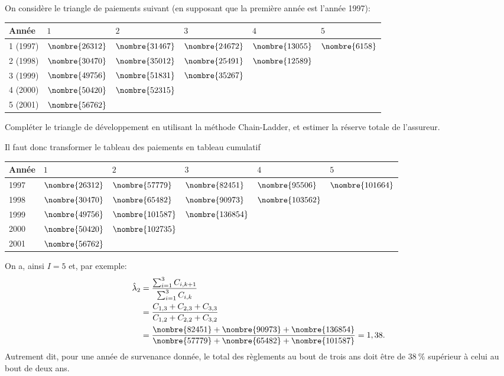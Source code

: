 \begin{exemple}
  On considère le triangle de paiements suivant (en supposant que la
  première année est l'année 1997):
  \begin{center}
    \begin{tabular}{|l|l l l l l|}\hline
      Année & $1$ & $2$ & $3$ & $4$ & $5$  \\ \hline
      1 (1997)& $\nombre{26312}$ & $\nombre{31467}$ & $\nombre{24672}$ & $\nombre{13055}$ & $\nombre{6158}$ \\
      2 (1998)& $\nombre{30470}$ & $\nombre{35012}$ & $\nombre{25491}$ & $\nombre{12589}$ &  \\
      3 (1999)& $\nombre{49756}$ & $\nombre{51831}$ & $\nombre{35267}$ &&\\
      4 (2000)& $\nombre{50420}$ & $\nombre{52315}$ & &&\\
      5 (2001)& $\nombre{56762}$ &  &&&\\ \hline
    \end{tabular}
  \end{center}
  Compléter le triangle de développement en utilisant la méthode
  Chain-Ladder, et estimer la réserve totale de l'assureur.

  Il faut donc transformer le tableau des paiements en tableau
  cumulatif
  \begin{center}
    \begin{tabular}{|l|l l l l l|}\hline
      Année & $1$ & $2$ & $3$ & $4$ & $5$  \\ \hline
      1997 &$\nombre{26312}$&	$\nombre{57779}$&	$\nombre{82451}$&	$\nombre{95506}$&	$\nombre{101664}$\\
      1998 &$\nombre{30470}$&	$\nombre{65482}$&	$\nombre{90973}$&	$\nombre{103562}$&	\\
      1999 &$\nombre{49756}$&	$\nombre{101587}$&	$\nombre{136854}$&	&	\\
      2000 &$\nombre{50420}$&	$\nombre{102735}$&	& &	\\
      2001 &$\nombre{56762}$&	&&&\\ \hline
    \end{tabular}
  \end{center}
  On a, ainsi $I = 5$ et, par exemple:
  \begin{align*}
    \hat{\lambda}_2 &= \frac{\sum_{i=1}^{3} C_{i,k+1}}{\sum_{i=1}^{3} C_{i,k}}\\
                    &= \frac{C_{1,3}+ C_{2,3}+ C_{3,3}}{C_{1,2}+ C_{2,2}+ C_{3,2}} \\
                    &= \frac{\nombre{82451} + \nombre{90973} + \nombre{136854}}{\nombre{57779} + \nombre{65482} + \nombre{101587}} = 1,38.
  \end{align*}
  Autrement dit, pour une année de survenance donnée, le total des
  règlements au bout de trois ans doit être de $38~\%$ supérieur à
  celui au bout de deux ans.


\end{exemple}
